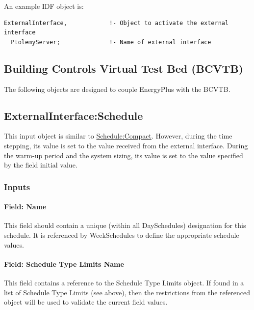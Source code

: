 An example IDF object is:

\begin{lstlisting}
ExternalInterface,            !- Object to activate the external interface
  PtolemyServer;              !- Name of external interface
\end{lstlisting}

\subsection{Building Controls Virtual Test Bed (BCVTB)}\label{building-controls-virtual-test-bed-bcvtb}

The following objects are designed to couple EnergyPlus with the BCVTB.

\subsection{ExternalInterface:Schedule}\label{externalinterfaceschedule}

This input object is similar to \hyperref[schedulecompact]{Schedule:Compact}. However, during the time stepping, its value is set to the value received from the external interface. During the warm-up period and the system sizing, its value is set to the value specified by the field initial value.

\subsubsection{Inputs}\label{inputs-1-016}

\paragraph{Field: Name}\label{field-name-1-015}

This field should contain a unique (within all DaySchedules) designation for this schedule. It is referenced by WeekSchedules to define the appropriate schedule values.

\paragraph{Field: Schedule Type Limits Name}\label{field-schedule-type-limits-name}

This field contains a reference to the Schedule Type Limits object. If found in a list of Schedule Type Limits (see above), then the restrictions from the referenced object will be used to validate the current field values.

